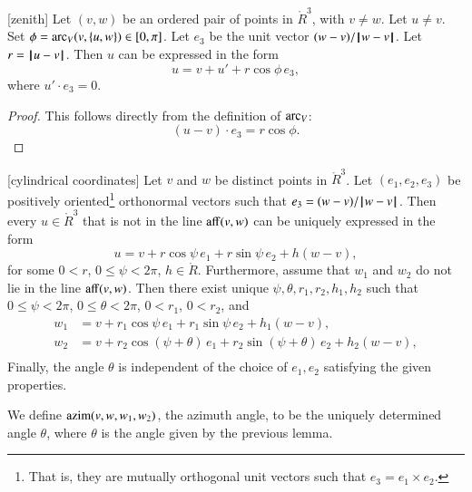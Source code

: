 \begin{lemma}[zenith]
Let $(v,w)$ be an ordered pair of points in $\ring{R}^3$, with $v\ne w$.
Let $u\ne v$.  Set $\phi = \operatorname{arc}_V(v,\{u,w\})\in[0,\pi]$.
Let $e_3$ be the unit vector $(w-v)/{\hskip0.1em|\hskip-0.15em|\hskip0.1em}w - v{\hskip0.1em|\hskip-0.15em|\hskip0.1em}$.  Let $r = {\hskip0.1em|\hskip-0.15em|\hskip0.1em}u - v{\hskip0.1em|\hskip-0.15em|\hskip0.1em}$.
Then $u$
can be expressed in the form
   $$
   u = v + u' +
   r\cos\phi\, e_3,
   $$
where $u'\cdot e_3 = 0$.
\end{lemma}

\begin{proof} This follows directly from the definition of $\operatorname{arc}_V$:
  $$(u-v)\cdot e_3 = r\cos\phi.$$
\end{proof}



\begin{lemma}[cylindrical coordinates]
Let $v$ and $w$ be distinct points in 
$\ring{R}^3$.  Let $(e_1,e_2,e_3)$ be positively oriented\footnote{That is, they are mutually orthogonal unit vectors such that $e_3 = e_1 \times e_2$.} orthonormal
vectors such that $e_3 = (w-v)/{\hskip0.1em|\hskip-0.15em|\hskip0.1em}w - v{\hskip0.1em|\hskip-0.15em|\hskip0.1em}$.
Then every
$u\in\ring{R}^3$ that is not in the line ${\operatorname{aff}}(v,w)$
can be uniquely expressed in the form
   $$
   u = v + r\cos\psi\, e_1 + r\sin\psi\, e_2 + h (w-v),
   $$
for some $0< r$, $0\le \psi < 2\pi$, $h\in\ring{R}$.
Furthermore,
assume that $w_1$ and $w_2$ do
not lie in the line ${\operatorname{aff}}(v,w)$.
Then there exist unique $\psi,\theta,r_1,r_2,h_1,h_2$
 such
that $0\le\psi<2\pi$, $0\le\theta < 2\pi$, $0 < r_1$, $0 < r_2$, and
  $$
  \begin{array}{lll}
    w_1 &= v + r_1\cos\psi\, e_1 + r_1\sin\psi\, e_2 + h_1(w-v),\\
    w_2 &= v + r_2\cos(\psi+\theta)\, e_1 + r_2\sin(\psi+\theta)\, e_2 
     + h_2(w-v),\\
\end{array}
  $$
Finally, the angle $\theta$ is independent of the choice of $e_1,e_2$
satisfying the given properties.
\end{lemma}

\begin{definition}[azim] 
We define ${\operatorname{azim}}(v,w,w_1,w_2)$, the azimuth angle, 
to be the uniquely determined
angle $\theta$, where $\theta$ is the angle given by the previous
lemma.
\end{definition}


